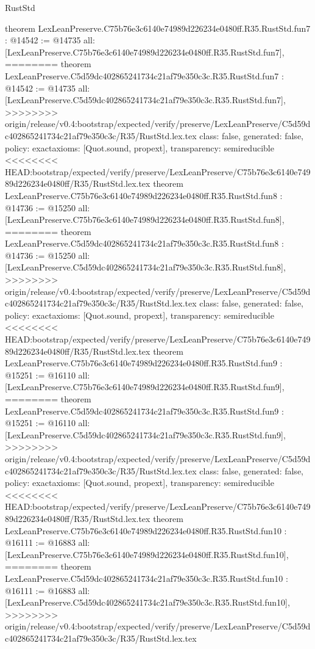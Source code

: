 \begin{lexlean}{RustStd}
\begin{coremodule}
{\begin{coremodule}
{{{{{{{{{theorem LexLeanPreserve.C75b76e3c6140e74989d226234e0480ff.R35.RustStd.fun7 : @14542 := @14735 {
  all: [LexLeanPreserve.C75b76e3c6140e74989d226234e0480ff.R35.RustStd.fun7],
========
theorem LexLeanPreserve.C5d59dc402865241734c21af79e350c3c.R35.RustStd.fun7 : @14542 := @14735 {
  all: [LexLeanPreserve.C5d59dc402865241734c21af79e350c3c.R35.RustStd.fun7],
>>>>>>>> origin/release/v0.4:bootstrap/expected/verify/preserve/LexLeanPreserve/C5d59dc402865241734c21af79e350c3c/R35/RustStd.lex.tex
  class: false,
  generated: false,
  policy: exact{axioms: [Quot.sound, propext]},
  transparency: semireducible
}
<<<<<<<< HEAD:bootstrap/expected/verify/preserve/LexLeanPreserve/C75b76e3c6140e74989d226234e0480ff/R35/RustStd.lex.tex
theorem LexLeanPreserve.C75b76e3c6140e74989d226234e0480ff.R35.RustStd.fun8 : @14736 := @15250 {
  all: [LexLeanPreserve.C75b76e3c6140e74989d226234e0480ff.R35.RustStd.fun8],
========
theorem LexLeanPreserve.C5d59dc402865241734c21af79e350c3c.R35.RustStd.fun8 : @14736 := @15250 {
  all: [LexLeanPreserve.C5d59dc402865241734c21af79e350c3c.R35.RustStd.fun8],
>>>>>>>> origin/release/v0.4:bootstrap/expected/verify/preserve/LexLeanPreserve/C5d59dc402865241734c21af79e350c3c/R35/RustStd.lex.tex
  class: false,
  generated: false,
  policy: exact{axioms: [Quot.sound, propext]},
  transparency: semireducible
}
<<<<<<<< HEAD:bootstrap/expected/verify/preserve/LexLeanPreserve/C75b76e3c6140e74989d226234e0480ff/R35/RustStd.lex.tex
theorem LexLeanPreserve.C75b76e3c6140e74989d226234e0480ff.R35.RustStd.fun9 : @15251 := @16110 {
  all: [LexLeanPreserve.C75b76e3c6140e74989d226234e0480ff.R35.RustStd.fun9],
========
theorem LexLeanPreserve.C5d59dc402865241734c21af79e350c3c.R35.RustStd.fun9 : @15251 := @16110 {
  all: [LexLeanPreserve.C5d59dc402865241734c21af79e350c3c.R35.RustStd.fun9],
>>>>>>>> origin/release/v0.4:bootstrap/expected/verify/preserve/LexLeanPreserve/C5d59dc402865241734c21af79e350c3c/R35/RustStd.lex.tex
  class: false,
  generated: false,
  policy: exact{axioms: [Quot.sound, propext]},
  transparency: semireducible
}
<<<<<<<< HEAD:bootstrap/expected/verify/preserve/LexLeanPreserve/C75b76e3c6140e74989d226234e0480ff/R35/RustStd.lex.tex
theorem LexLeanPreserve.C75b76e3c6140e74989d226234e0480ff.R35.RustStd.fun10 : @16111 := @16883 {
  all: [LexLeanPreserve.C75b76e3c6140e74989d226234e0480ff.R35.RustStd.fun10],
========
theorem LexLeanPreserve.C5d59dc402865241734c21af79e350c3c.R35.RustStd.fun10 : @16111 := @16883 {
  all: [LexLeanPreserve.C5d59dc402865241734c21af79e350c3c.R35.RustStd.fun10],
>>>>>>>> origin/release/v0.4:bootstrap/expected/verify/preserve/LexLeanPreserve/C5d59dc402865241734c21af79e350c3c/R35/RustStd.lex.tex
}}}}}}}}}}}}}}
\end{coremodule}}
\end{coremodule}
\end{lexlean}

